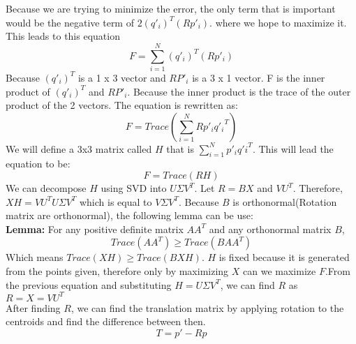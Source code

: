 \documentclass{article}
\begin{document}
Because we are trying to minimize the error, the only term that is important would be the negative term of $2(q'_i)^T(Rp'_i)$. where we hope to maximize it. This leads to this equation
\begin{equation*}
F = \sum_{i = 1}^{N} (q'_i)^T(Rp'_i)
\end{equation*}
Because $(q'_i)^T$ is a 1 x 3 vector and $RP'_i$ is a 3 x 1 vector. F is the inner product of  $(q'_i)^T$ and $RP'_i$. Because the inner product is the trace of the outer product of the 2 vectors. The equation is rewritten as:
\begin{equation*}
F = Trace(\sum_{i = 1}^{N} Rp'_i{q'_i}^T)
\end{equation*}
We will define a 3x3 matrix called $H$ that is $\sum_{i = 1}^{N} p'_i {q'i}^{T}$. This will lead the equation to be:
\begin{equation*}
F = Trace(RH)
\end{equation*}
We can decompose $H$ using SVD into $U\Sigma V^T$. Let $R = BX$ and $VU^T$. Therefore, $XH = VU^TU\Sigma V^T$ which is equal to $V\Sigma V^T$. Because $B$ is orthonormal(Rotation matrix are orthonormal), the following lemma can be use:\\
\textbf{Lemma:} For any positive definite matrix $AA^T$ and any orthonormal matrix $B$,
\begin{equation*}
  Trace(AA^T) \geq Trace(BAA^T)
\end{equation*}
Which means $Trace(XH) \geq Trace(BXH)$. $H$ is fixed because it is generated from the points given, therefore only by maximizing $X$ can we maximize $F$.From the previous equation and substituting $H=U\Sigma V^T$, we can find $R$ as $R = X = VU^T$\\
After finding $R$, we can find the translation matrix by applying rotation to the centroids and find the difference between then.
\begin{equation*}
T = p' - Rp
\end{equation*}

\end{document}
